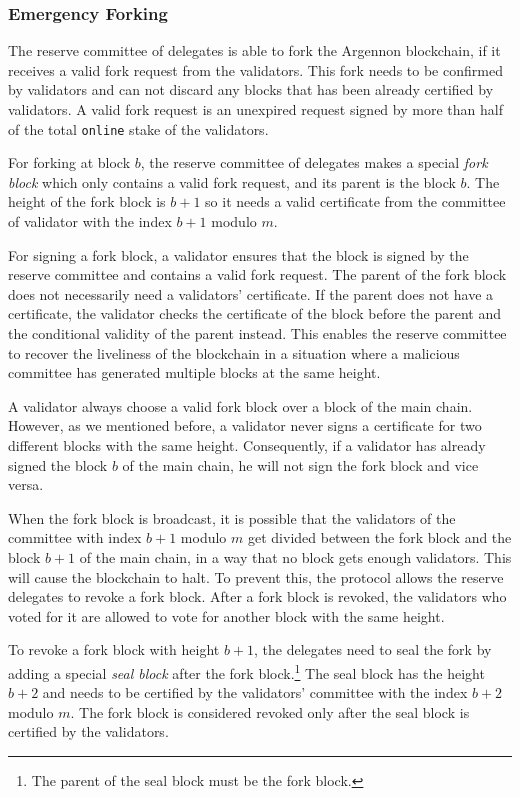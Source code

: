\subsubsection{Emergency Forking}

The reserve committee of delegates is able to fork the Argennon blockchain, if it receives a valid fork request
from the validators.
This fork needs to be confirmed by validators and can not discard any blocks that has been already certified
by validators.
A valid fork request is an unexpired request signed by more than half of the
total \texttt{online} stake of the validators.

For forking at block $b$, the reserve committee of delegates
makes a special \emph{fork block} which only contains a valid fork request, and its parent is the block $b$.
The height of the fork block is
$b + 1$ so it needs a valid certificate from the committee of validator with the index $b+1$ modulo $m$.

For signing a fork block, a validator ensures that the block is signed by the reserve committee and contains
a valid fork request. The parent of the fork block does not necessarily need a validators' certificate. If the
parent does not have a certificate, the validator checks the certificate of the block before the parent and
the conditional validity of the parent instead. This enables the reserve committee
to recover the liveliness of
the blockchain in a situation where a malicious committee has generated multiple blocks at the same height.

A validator always choose a valid fork block over a block of the main chain. However, as we mentioned before,
a validator never signs a certificate for two different blocks with the same height. Consequently, if a validator
has already signed the block $b$ of the main chain, he will not sign the fork block and vice versa.

When the fork block is broadcast, it is possible that the validators of the committee with index $b+1$ modulo $m$
get divided between the fork block and the block $b+1$ of the main chain, in a way that no block gets enough validators.
This will cause the blockchain to halt. To prevent this, the protocol allows the reserve delegates to revoke a
fork block. After a fork block
is revoked, the validators who voted for it are allowed to vote for another block with the same
height.

To revoke a fork block with height $b+1$, the delegates need to seal the fork by adding a special
\emph{seal block} after the fork block.\footnote{The parent of the seal block must be the fork block.} The seal block
has the height $b+2$ and needs to be certified by the validators' committee with the
index $b+2$ modulo $m$. The fork block is considered revoked only after the seal block is certified by the validators.

